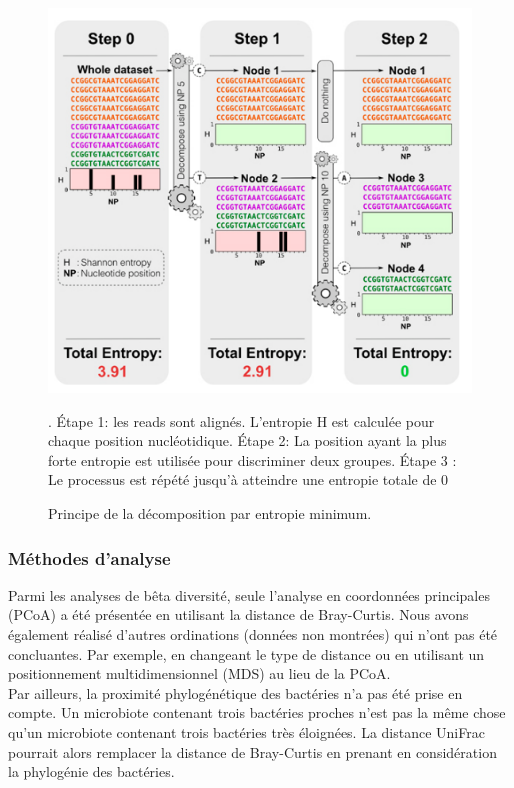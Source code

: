 \documentclass[12pt,a4paper]{article}
\begin{document}
\begin{figure}
\begin{center}
\includegraphics[scale=0.65]{img/entropy.png}\hfill
\end{center}
\caption{Principe de la décomposition par entropie minimum.}\cite{Bobadilla2015}. Étape 1: les reads sont alignés. L'entropie H est calculée pour chaque position nucléotidique. Étape 2: La position ayant la plus forte entropie est utilisée pour discriminer deux groupes. Étape 3 : Le processus est répété jusqu'à atteindre une entropie totale de 0 
\label{entropy}
\end{figure}
\subsubsection{Méthodes d'analyse}
Parmi les analyses de bêta diversité, seule l'analyse en coordonnées principales (PCoA) a été présentée en utilisant la distance de Bray-Curtis.
Nous avons également réalisé d'autres ordinations (données non montrées) qui n'ont pas été concluantes. Par exemple, en changeant le type de distance ou en utilisant un positionnement multidimensionnel (MDS) au lieu de la PCoA. \\
Par ailleurs, la proximité phylogénétique des bactéries n'a pas été prise en compte. Un microbiote contenant trois bactéries proches n'est pas la même chose qu'un microbiote contenant trois bactéries très éloignées.
La distance UniFrac\cite{Lozupone2005} pourrait alors remplacer la distance de Bray-Curtis en prenant en considération la phylogénie des bactéries.
\end{document}
